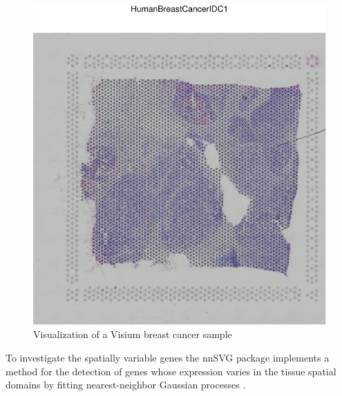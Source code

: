 \documentclass[graybox]{svmult}
\begin{document}
\begin{figure}
\includegraphics[width=1\linewidth,]{spatpdfs/tenxvisium-1} \caption{Visualization of a Visium breast cancer sample}\label{fig:tenxvisium}
\end{figure}

To investigate the spatially variable genes the nnSVG package
implements a method for the detection of genes whose expression varies in the
tissue spatial domains by fitting nearest-neighbor Gaussian processes 
\cite{webr23}.
\end{document}
